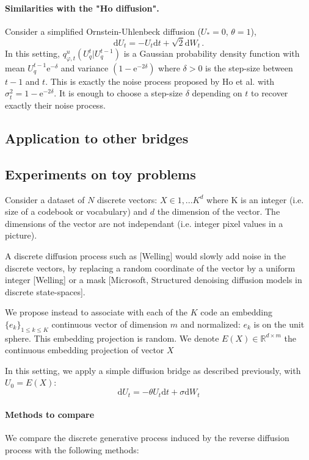 \documentclass{article}
\newcommand{\rset}{\ensuremath{\mathbb{R}}}
\begin{document}
\paragraph{Similarities with the "Ho diffusion". }
Consider a simplified Ornstein-Uhlenbeck diffusion ($U_* = 0$, $\theta = 1$),
$$
\mathrm{d}U_t = -U_t\mathrm{d}t + \sqrt{2}\mathrm{d}W_t\,.
$$
 In this setting, $q^u_{\varphi,t}(U_q^{t}|U_q^{t-1})$ is a Gaussian probability density function with mean $U_q^{t-1}\mathrm{e}^{-\delta}$ and variance $(1-\mathrm{e}^{-2\delta})$ where $\delta>0$ is the step-size between $t-1$ and $t$. This is exactly the noise process proposed by Ho et al. with $\sigma^2_t = 1 - \mathrm{e}^{-2\delta}$. It is enough to choose a step-size $\delta$ depending on  $t$ to recover exactly their noise process.

\subsection{Application to other bridges}

\subsection{Experiments on toy problems}

Consider a dataset of $N$ discrete vectors: $X \in {1,...K}^d$ where K is an integer (i.e. size of a codebook or vocabulary) and $d$ the dimension of the vector. The dimensions of the vector are not independant (i.e. integer pixel values in a picture).

A discrete diffusion process such as [Welling] would slowly add noise in the discrete vectors, by replacing a random coordinate of the vector by a uniform integer [Welling] or a mask [Microsoft, Structured denoising diffusion models in discrete state-spaces].

We propose instead to associate with each of the $K$ code an embedding $\{e_k\}_{1 \leq k \leq K}$ continuous vector of dimension $m$ and normalized: $e_k$ is on the unit sphere. This embedding projection is random. We denote $E(X) \in \rset^{d \times m}$ the continuous embedding projection of vector $X$

In this setting, we apply a simple diffusion bridge as described previously, with $U_0 = E(X)$:
$$
\mathrm{d}U_t = -\theta U_t \mathrm{d}t + \sigma\mathrm{d}W_t
$$

\paragraph{Methods to compare} We compare the discrete generative process induced by the reverse diffusion process with the following methods:
\end{document}
